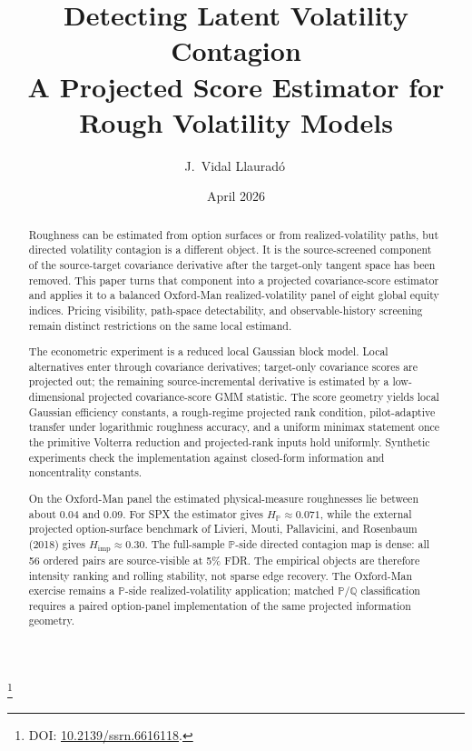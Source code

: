 \documentclass[11pt,a4paper]{amsart}
\theoremstyle{plain}
\theoremstyle{definition}
\theoremstyle{remark}
\newcommand{\PP}{\mathbb{P}}
\newcommand{\QQ}{\mathbb{Q}}
\begin{document}
\title[Detecting Latent Volatility Contagion]{%
Detecting Latent Volatility Contagion\\[0.3em]
{\small A Projected Score Estimator for Rough Volatility Models}}
\author[J.~Vidal Llaurad\'o]{J.~Vidal Llaurad\'o\,}
\thanks{DOI: \href{https://doi.org/10.2139/ssrn.6616118}{10.2139/ssrn.6616118}.}
\date{April 2026}

\begin{abstract}
Roughness can be estimated from option surfaces or from realized-volatility paths, but directed
volatility contagion is a different object.  It is the source-screened component of the
source-target covariance derivative after the target-only tangent space has been removed.  This
paper turns that component into a projected covariance-score estimator and applies it to a balanced
Oxford-Man realized-volatility panel of eight global equity indices.  Pricing visibility,
path-space detectability, and observable-history screening remain distinct restrictions on the same
local estimand.

The econometric experiment is a reduced local Gaussian block model.  Local alternatives enter
through covariance derivatives; target-only covariance scores are projected out; the remaining
source-incremental derivative is estimated by a low-dimensional projected covariance-score GMM
statistic.  The score geometry yields local Gaussian efficiency constants, a rough-regime projected
rank condition, pilot-adaptive transfer under logarithmic roughness accuracy, and a uniform minimax
statement once the primitive Volterra reduction and projected-rank inputs hold uniformly.  Synthetic
experiments check the implementation against closed-form information and noncentrality constants.

On the Oxford-Man panel the estimated physical-measure roughnesses lie between about 0.04 and
0.09.  For SPX the estimator gives \(H_{\PP}\approx0.071\), while the external projected
option-surface benchmark of Livieri, Mouti, Pallavicini, and Rosenbaum (2018) gives
\(H_{\mathrm{imp}}\approx0.30\).  The full-sample \(\PP\)-side directed contagion map is dense:
all 56 ordered pairs are source-visible at 5\% FDR.  The empirical objects are therefore intensity
ranking and rolling stability, not sparse edge recovery.  The Oxford-Man exercise remains a
\(\PP\)-side realized-volatility application; matched \(\PP/\QQ\) classification requires a paired
option-panel implementation of the same projected information geometry.
\end{abstract}
\end{document}
